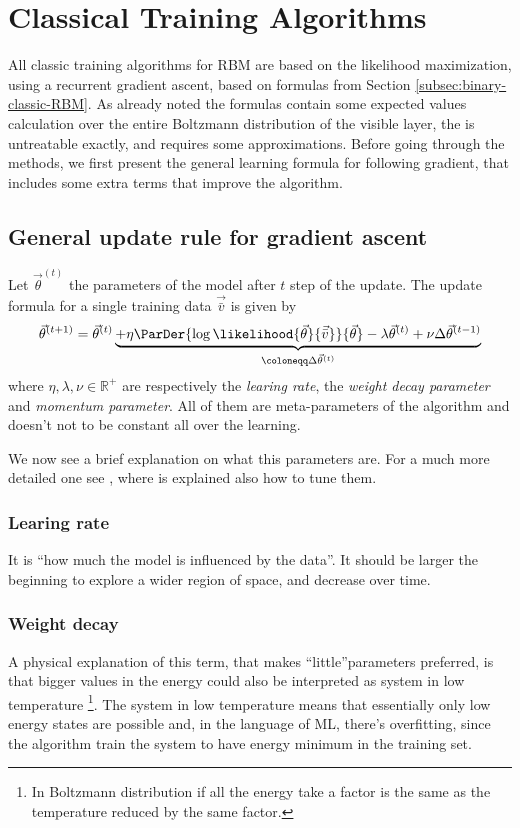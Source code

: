 \section{Classical Training Algorithms}
  All classic training algorithms for RBM are based on the likelihood maximization,
  using a recurrent gradient ascent, based on formulas from Section \ref{subsec:binary-classic-RBM}.
  As already noted the formulas contain some expected values calculation over the
  entire Boltzmann distribution of the visible layer, the is untreatable exactly,
  and requires some approximations.
  Before going through the methods, we first present the general learning formula for 
  following gradient,  that includes some extra terms that improve the algorithm.
  
  \subsection{General update rule for gradient ascent}
  Let \(\vec{\theta}^{(t)}\) the parameters of the model after \(t\) step of the update.
  The update formula for a single training data \(\vec{\bar{v}}\) is given by
  \[
    \vec{\theta}^{(t+1)} = \vec{\theta}^{(t)}
                           \underbrace{
                             + \eta \ParDer{\log\likelihood{\vec{\theta}}{\vec{\bar{v}}}}{\vec{\theta}}
                             - \lambda \vec{\theta}^{(t)}
                             + \nu \Delta\vec{\theta}^{(t-1)}
                           }_{\coloneqq \Delta\vec{\theta}^{(t)}}
  \]
  where \(\eta,\lambda,\nu \in \mathbb{R}^+\) are respectively the \emph{learing rate},
  the \emph{weight decay parameter} and \emph{momentum parameter}.
  All of them are meta-parameters of the algorithm and doesn't not to be constant all
  over the learning.
  
  We now see a brief explanation on what this parameters are. For a much more detailed one
  see \cite{hinton2012practical}, where is explained  also how to tune them.
  \subsubsection{Learing rate}
  It is ``how much the model is influenced by the data''. It should be larger the beginning to
  explore a wider region of space, and decrease over time.
  \subsubsection{Weight decay}
  A physical explanation of this term, that makes ``little''parameters preferred, is that
  bigger values in the energy could also be interpreted as system in low temperature
  \footnote{In Boltzmann distribution if all the energy take a factor is the same as
  the temperature reduced by the same factor.}. The system in low temperature means that
  essentially only low energy states are possible and, in the language of ML, there's overfitting,
  since the algorithm train the system to have energy minimum in the training set.
  
